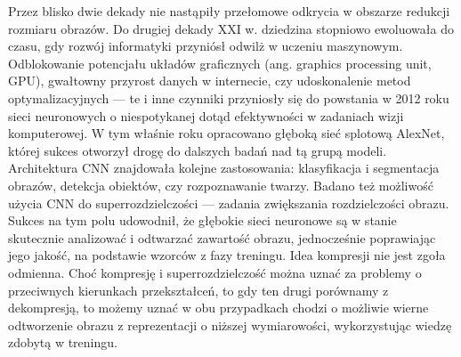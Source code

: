 Przez blisko dwie dekady nie nastąpiły przełomowe odkrycia w obszarze redukcji rozmiaru obrazów. Do drugiej dekady XXI w. dziedzina stopniowo ewoluowała do czasu, gdy rozwój informatyki przyniósł odwilż w uczeniu maszynowym. Odblokowanie potencjału układów graficznych (ang. graphics processing unit, GPU), gwałtowny przyrost danych w internecie, czy udoskonalenie metod optymalizacyjnych --- te i inne czynniki przyniosły się do powstania w 2012 roku sieci neuronowych o niespotykanej dotąd efektywności w zadaniach wizji komputerowej. W tym właśnie roku opracowano głęboką sieć splotową AlexNet, której sukces otworzył drogę do dalszych badań nad tą grupą modeli. Architektura CNN znajdowała kolejne zastosowania: klasyfikacja i segmentacja obrazów, detekcja obiektów, czy rozpoznawanie twarzy. Badano też możliwość użycia CNN do superrozdzielczości --- zadania zwiększania rozdzielczości obrazu. Sukces na tym polu udowodnił, że głębokie sieci neuronowe są w stanie skutecznie analizować i odtwarzać zawartość obrazu, jednocześnie poprawiając jego jakość, na podstawie wzorców z fazy treningu. Idea kompresji nie jest zgoła odmienna. Choć kompresję i superrozdzielczość można uznać za problemy o przeciwnych kierunkach przekształceń, to gdy ten drugi porównamy z dekompresją, to możemy uznać w obu przypadkach chodzi o możliwie wierne odtworzenie obrazu z reprezentacji o niższej wymiarowości, wykorzystując wiedzę zdobytą w treningu.

